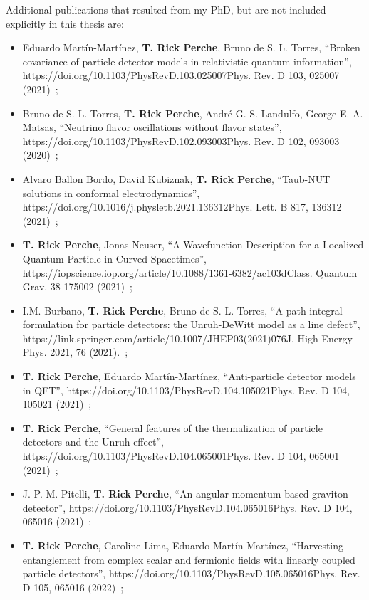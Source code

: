 \documentclass[letterpaper,12pt,titlepage,oneside,final]{book}
\newcommand{\href}[1]{#1} %
\begin{document}
Additional publications that resulted from my PhD, but are not included explicitly in this thesis are:
\begin{itemize}
    \item[(12)] Eduardo Martín-Martínez, \textbf{T. Rick Perche}, Bruno de S. L. Torres, ``Broken covariance of particle detector models in relativistic quantum information'', \href{https://doi.org/10.1103/PhysRevD.103.025007}{Phys. Rev. D 103, 025007 (2021)}~\cite{us2};
    \item[(13)] Bruno de S. L. Torres, \textbf{T. Rick Perche}, André G. S. Landulfo, George E. A. Matsas, ``Neutrino flavor oscillations without flavor states'', \href{https://doi.org/10.1103/PhysRevD.102.093003}{Phys. Rev. D 102, 093003 (2020)}~\cite{neutrinos};
    \item[(14)] Alvaro Ballon Bordo, David Kubiznak, \textbf{T. Rick Perche}, ``Taub-NUT solutions in conformal electrodynamics'', \href{https://doi.org/10.1016/j.physletb.2021.136312}{Phys. Lett. B 817, 136312 (2021)}~\cite{alvaro};
    \item[(15)] \textbf{T. Rick Perche}, Jonas Neuser, ``A Wavefunction Description for a Localized Quantum Particle in Curved Spacetimes'', \href{https://iopscience.iop.org/article/10.1088/1361-6382/ac103d}{Class. Quantum Grav. 38 175002 (2021)}~\cite{jonas};
    \item[(16)] I.M. Burbano, \textbf{T. Rick Perche}, Bruno de S. L. Torres, ``A path integral formulation for particle detectors: the Unruh-DeWitt model as a line defect'', \href{https://link.springer.com/article/10.1007/JHEP03(2021)076}{J. High Energy Phys. 2021, 76 (2021).}~\cite{ivan};
    \item[(17)] \textbf{T. Rick Perche}, Eduardo Martín-Martínez, ``Anti-particle detector models in QFT'', \href{https://doi.org/10.1103/PhysRevD.104.105021}{Phys. Rev. D 104, 105021 (2021)}~\cite{antiparticles};
    \item[(18)] \textbf{T. Rick Perche}, ``General features of the thermalization of particle detectors and the Unruh effect'', \href{https://doi.org/10.1103/PhysRevD.104.065001}{Phys. Rev. D 104, 065001 (2021)}~\cite{mine};
    \item[(19)] J. P. M. Pitelli, \textbf{T. Rick Perche}, ``An angular momentum based graviton detector'', \href{https://doi.org/10.1103/PhysRevD.104.065016}{Phys. Rev. D 104, 065016 (2021)}~\cite{pitelli};
    \item[(20)] \textbf{T. Rick Perche}, Caroline Lima, Eduardo Martín-Martínez, ``Harvesting entanglement from complex scalar and fermionic fields with linearly coupled particle detectors'', \href{https://doi.org/10.1103/PhysRevD.105.065016}{Phys. Rev. D 105, 065016 (2022)}~\cite{carol};

\end{itemize}
\end{document}
